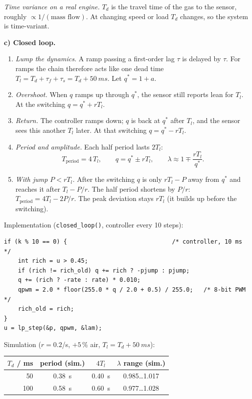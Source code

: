 \begin{solution}
\emph{Time variance on a real engine.} $T_d$ is the travel time of the gas
to the sensor, roughly $\propto1/(\text{mass flow})$. At changing speed or load
$T_d$ changes, so the system is time-variant.

\textbf{c) Closed loop.}
\begin{enumerate}[label=Step \arabic*:,leftmargin=*,itemsep=1pt]
  \item \emph{Lump the dynamics.} A ramp passing a first-order lag $\tau$ is
    delayed by $\tau$. For ramps the chain therefore acts like one dead time
    $T_l=T_d+\tau_f+\tau_s=T_d+\SI{50}{ms}$. Let $q^*=1+a$.
  \item \emph{Overshoot.} When $q$ ramps up through $q^*$, the sensor still
    reports lean for $T_l$. At the switching $q=q^*+rT_l$.
  \item \emph{Return.} The controller ramps down; $q$ is back at $q^*$ after
    $T_l$, and the sensor sees this another $T_l$ later. At that switching
    $q=q^*-rT_l$.
  \item \emph{Period and amplitude.} Each half period lasts $2T_l$:
    \[ T_{\text{period}} = 4\,T_l,\qquad q=q^*\pm rT_l,\qquad
       \lambda\approx 1\mp\frac{rT_l}{q^*}. \]
  \item \emph{With jump $P<rT_l$.} After the switching $q$ is only
    $rT_l-P$ away from $q^*$ and reaches it after $T_l-P/r$. The half period
    shortens by $P/r$: $T_{\text{period}}=4T_l-2P/r$. The peak deviation stays
    $rT_l$ (it builds up before the switching).
\end{enumerate}
Implementation (\texttt{closed\_loop()}, controller every 10 steps):
\begin{lstlisting}[style=dspc,numbers=none]
if (k % 10 == 0) {                              /* controller, 10 ms */
    int rich = u > 0.45;
    if (rich != rich_old) q += rich ? -pjump : pjump;
    q += (rich ? -rate : rate) * 0.010;
    qpwm = 2.0 * floor(255.0 * q / 2.0 + 0.5) / 255.0;   /* 8-bit PWM */
    rich_old = rich;
}
u = lp_step(&p, qpwm, &lam);
\end{lstlisting}
Simulation ($r=0.2$/s, $+5\,\%$ air, $T_l=T_d+\SI{50}{ms}$):
\begin{center}
\small
\begin{tabular}{@{}rccc@{}}
\toprule
$T_d$ / ms & period (sim.) & $4T_l$ & $\lambda$ range (sim.) \\
\midrule
50  & \SI{0.38}{s} & \SI{0.40}{s} & 0.985\dots1.017 \\
100 & \SI{0.58}{s} & \SI{0.60}{s} & 0.977\dots1.028 \\

\end{tabular}
\end{center}
\end{solution}
